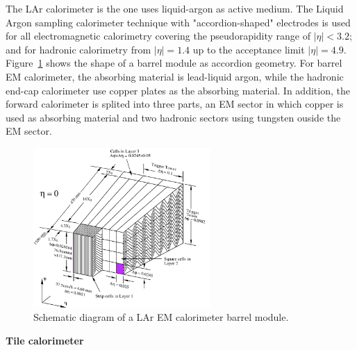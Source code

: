 The LAr calorimeter is the one uses liquid-argon as active medium.
The Liquid Argon sampling calorimeter technique with "accordion-shaped" electrodes is used for all electromagnetic calorimetry covering the pseudorapidity range of $|\eta|<3.2$;
and for hadronic calorimetry from $|\eta| = 1.4$ up to the acceptance limit $|\eta| = 4.9$\cite{CERN-LHCC-96-041}.
Figure~\ref{fig:calo_lar} shows the shape of a barrel module as accordion geometry.
For barrel EM calorimeter, the absorbing material is lead-liquid argon, while the hadronic end-cap calorimeter use copper plates as the absorbing material.
In addition, the forward calorimeter is splited into three parts, an EM sector in which copper is used as absorbing material and two hadronic sectors using tungsten ouside the EM sector.
\begin{figure}[!htb]
  \centering
  \includegraphics[width=0.6\textwidth]{figures/Detector/calo_lar.png}
  \caption{Schematic diagram of a LAr EM calorimeter barrel module.}
  \label{fig:calo_lar}
\end{figure}

\textbf{Tile calorimeter}

